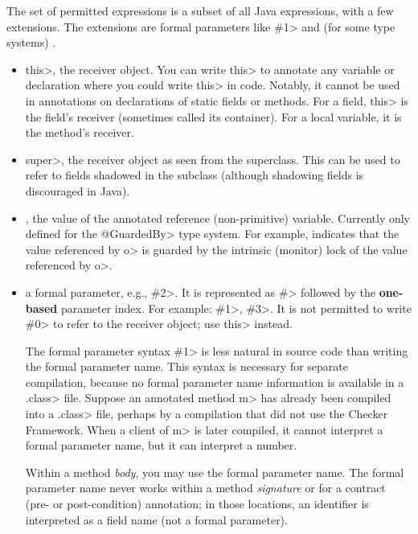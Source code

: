 The set of permitted expressions is a subset of all Java expressions,
with a few extensions.
The extensions are formal parameters like \<\#1> and (for some type
systems) .

\begin{itemize}
\item
  \<this>, the receiver object.  You can write \<this> to annotate any
  variable or declaration where you could write \<this> in code.
  Notably, it cannot be used in annotations on declarations of
  static fields or methods.  For a field, \<this> is the field's
  receiver (sometimes called its container).  For a local variable, it is the
  method's receiver.

\item
  \<super>, the receiver object as seen from the superclass.  This can be used
  to refer to fields shadowed in the subclass (although shadowing fields is
  discouraged in Java).

\item
  , the value of the annotated reference (non-primitive) variable.
  Currently only defined for the \<@GuardedBy> type system.
  For example,  indicates that the value
  referenced by \<o> is guarded by the intrinsic (monitor) lock of the value
  referenced by \<o>.

\item
  a formal parameter, e.g., \<\#2>.  It is represented as \<\#> followed by the \textbf{one-based} parameter
  index.  For example: \<\#1>, \<\#3>.  It is not permitted to write \<\#0> to
  refer to the receiver object; use \<this> instead.

  The formal parameter syntax \<\#1> is less natural in source code
  than writing the formal parameter name.  This syntax is necessary for
  separate compilation, because no formal parameter name information is
  available in a \<.class> file.  Suppose an annotated method \<m> has
  already been compiled into a \<.class> file, perhaps by a compilation
  that did not use the Checker Framework.  When a client of \<m> is later
  compiled, it cannot interpret a formal parameter name, but it can
  interpret a number.

  Within a method \emph{body}, you may use the formal parameter name.  The
  formal parameter name never works within a method \emph{signature} or for
  a contract (pre- or post-condition) annotation; in those locations, an
  identifier is interpreted as a field name (not a formal parameter).


\end{itemize}
